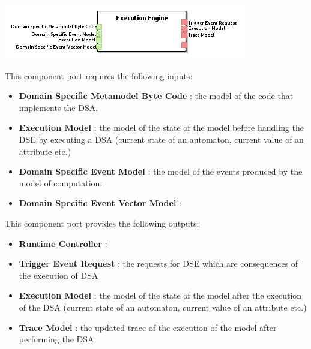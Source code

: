 \documentclass{gemoc} %
\begin{document}
\begin{center}
\includegraphics*[trim=0.0cm 0.0cm 0cm 0.0cm, clip=true]{../images/generated/Generated_Execution_Engine.png}
\end{center}

This component port requires the following inputs:
\begin{itemize}
  \item \textbf{Domain Specific Metamodel Byte Code} :
the model of the code that implements the DSA.
  \item \textbf{Execution Model} :
the model of the state of the model before handling the DSE by executing a DSA (current state of an automaton, current value of an attribute etc.)
  \item \textbf{Domain Specific Event Model} :
the model of the events produced by the model of computation.
  \item \textbf{Domain Specific Event Vector Model} :
\end{itemize}

This component port provides the following outputs:
\begin{itemize}
  \item \textbf{Runtime Controller} :
  \item \textbf{Trigger Event Request} :
the requests for DSE which are consequences of the execution of DSA
  \item \textbf{Execution Model} :
the model of the state of the model after the execution of the DSA (current state of an automaton, current value of an attribute etc.)
  \item \textbf{Trace Model} :
the updated trace of the execution of the model after performing the DSA
\end{itemize}
\end{document}

